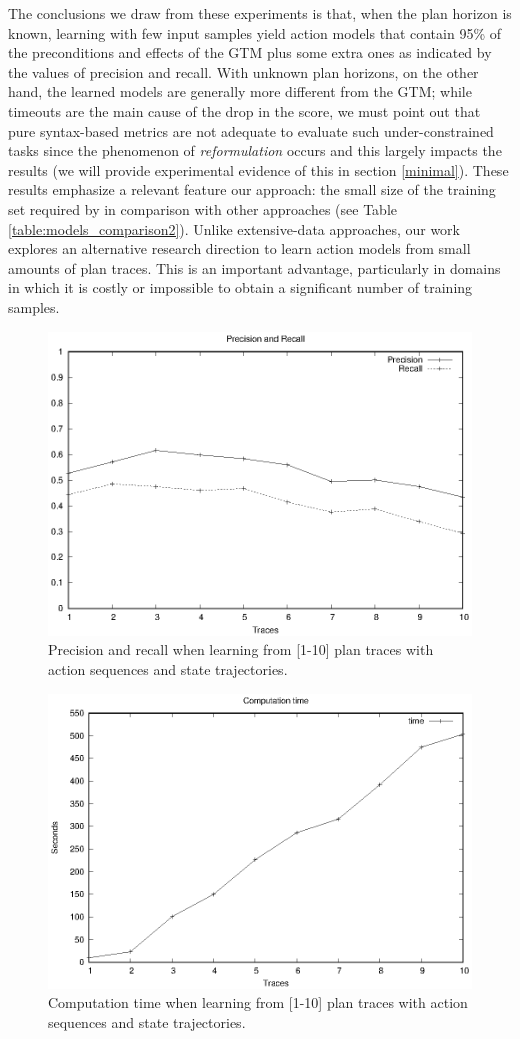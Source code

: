 The conclusions we draw from these experiments is that, when the plan horizon is known, learning with few input samples yield action models that contain 95\% of the preconditions and effects of the GTM plus some extra ones as indicated by the values of precision and recall. With unknown plan horizons, on the other hand, the learned models are generally more different from the GTM; while timeouts are the main cause of the drop in the score, we must point out that pure syntax-based metrics are not adequate to evaluate such under-constrained tasks since the phenomenon of \emph{reformulation} occurs and this largely impacts the results (we will provide experimental evidence of this in section \ref{minimal}). These results emphasize a relevant feature our approach: the small size of the training set required by \FAMA in comparison with other approaches (see Table \ref{table:models_comparison2}). Unlike extensive-data approaches, our work explores an alternative research direction to learn action models from small amounts of plan traces. This is an important advantage, particularly in domains in which it is costly or impossible to obtain a significant number of training samples.


\begin{figure}[hbt!]
	\centering
	\includegraphics[width=0.65\linewidth]{figures/input_size_0_0_precision.eps}
	\caption{Precision and recall when learning from [1-10] plan traces with \NO action sequences and \NO state trajectories.}
	\label{fig:pspace_quality}
\end{figure}
\begin{figure}[hbt!]
	\centering
	\includegraphics[width=0.65\linewidth]{figures/input_size_0_0_time.eps}
	\caption{Computation time when learning from [1-10] plan traces with \NO action sequences and \NO state trajectories.}
	\label{fig:pspace_time}
\end{figure}


